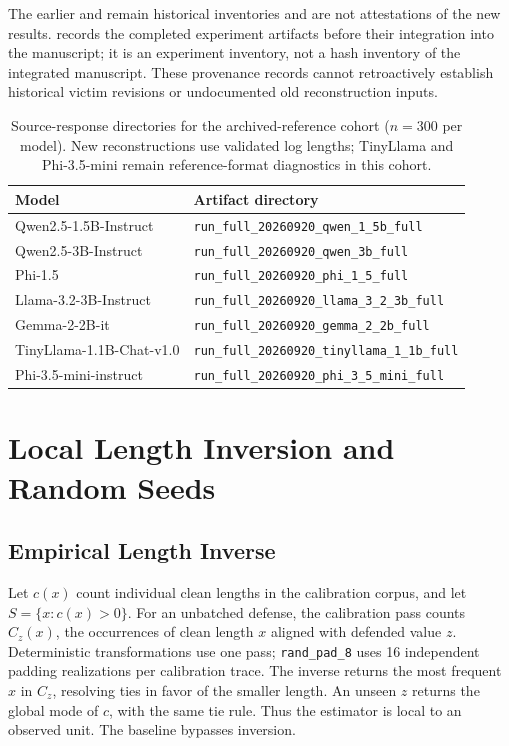 \documentclass[electronics,article,submit,pdftex,moreauthors]{Definitions/mdpi}
\begin{document}
The earlier  and  remain historical inventories and are not attestations of the new results.  records the completed experiment artifacts before their integration into the manuscript; it is an experiment inventory, not a hash inventory of the integrated manuscript. These provenance records cannot retroactively establish historical victim revisions or undocumented old reconstruction inputs.

\begin{table}[ht]
\centering
\caption{Source-response directories for the archived-reference cohort ($n=300$ per model). New reconstructions use validated log lengths; TinyLlama and Phi-3.5-mini remain reference-format diagnostics in this cohort.}
\label{tab:run_ids}
\begin{tabular}{l l}
\toprule
Model & Artifact directory \\
\midrule
Qwen2.5-1.5B-Instruct & \texttt{run\_full\_20260920\_qwen\_1\_5b\_full} \\
Qwen2.5-3B-Instruct & \texttt{run\_full\_20260920\_qwen\_3b\_full} \\
Phi-1.5 & \texttt{run\_full\_20260920\_phi\_1\_5\_full} \\
Llama-3.2-3B-Instruct & \texttt{run\_full\_20260920\_llama\_3\_2\_3b\_full} \\
Gemma-2-2B-it & \texttt{run\_full\_20260920\_gemma\_2\_2b\_full} \\
TinyLlama-1.1B-Chat-v1.0 & \texttt{run\_full\_20260920\_tinyllama\_1\_1b\_full} \\
Phi-3.5-mini-instruct & \texttt{run\_full\_20260920\_phi\_3\_5\_mini\_full} \\
\bottomrule
\end{tabular}
\end{table}

\section{Local Length Inversion and Random Seeds}\label{app:map-seeds}

\subsection{Empirical Length Inverse}
Let $c(x)$ count individual clean lengths in the calibration corpus, and let $S=\{x:c(x)>0\}$. For an unbatched defense, the calibration pass counts $C_z(x)$, the occurrences of clean length $x$ aligned with defended value $z$. Deterministic transformations use one pass; \texttt{rand\_pad\_8} uses 16 independent padding realizations per calibration trace. The inverse returns the most frequent $x$ in $C_z$, resolving ties in favor of the smaller length. An unseen $z$ returns the global mode of $c$, with the same tie rule. Thus the estimator is local to an observed unit. The baseline bypasses inversion.
\end{document}

